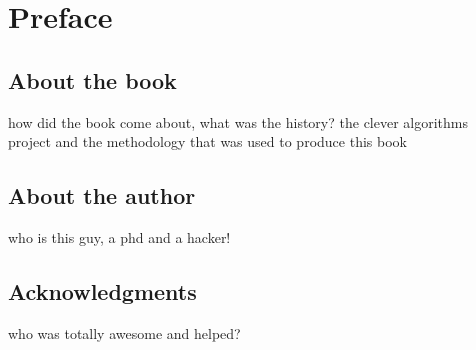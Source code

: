 

\chapter*{Preface}

\section*{About the book}
how did the book come about, what was the history?
the clever algorithms project and the methodology that was used to produce this book

\section*{About the author}
who is this guy, a phd and a hacker!

\section*{Acknowledgments}
who was totally awesome and helped?
